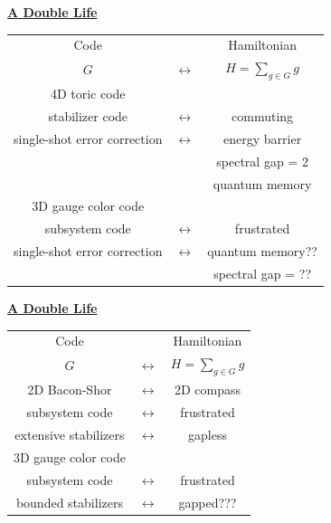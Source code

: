 \documentclass[11pt]{article}
\def\heading #1{\centerline{\underline{\bf\LARGE #1}}}
\begin{document}
\vspace*{-1.0cm}
{\centerline{\underline{\bf A Double Life}}}
\vspace*{-0.0cm}
\begin{center}
\begin{tabular}{|ccc|}
\hline
Code       & & Hamiltonian \\
$G$        & $ \longleftrightarrow $ & $H = \sum_{g\in G} g $ \\
\hline
4D toric code       &            &  \\
stabilizer code & $\longleftrightarrow$ & commuting \\
single-shot error correction & $\longleftrightarrow$   &  energy barrier \\
 & & spectral gap = 2 \\
 & & quantum memory \\
\hline
3D gauge color code &            &  \\
subsystem code & $\longleftrightarrow$ &  frustrated \\
single-shot error correction &  $\longleftrightarrow$  &  quantum memory?? \\
 & & spectral gap = ?? \\
\hline
\end{tabular}
\end{center}


\newpage %


\vspace*{-1.0cm}
{\centerline{\underline{\bf A Double Life}}}
\begin{center}
\resizebox{10cm}{!} {
\begin{tabular}{|ccc|}
\hline
Code       & & Hamiltonian \\
$G$        & $ \longleftrightarrow $ & $H = \sum_{g\in G} g $ \\
\hline
2D Bacon-Shor  & $\longleftrightarrow$ & 2D compass \\
subsystem code & $\longleftrightarrow$ &  frustrated \\
extensive stabilizers & $\longleftrightarrow$   &  gapless \\
\hline
3D gauge color code &            &  \\
subsystem code & $\longleftrightarrow$ &  frustrated \\
bounded stabilizers & $\longleftrightarrow$   &  gapped??? \\
\hline
\end{tabular}}
\end{center}
\end{document}
